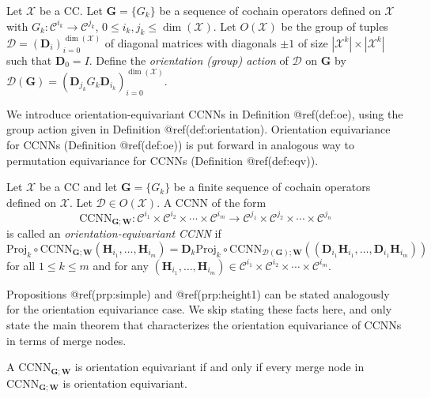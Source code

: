 \documentclass[
  12pt,
]{krantz}
\begin{document}
\label{orientation}
Let \(\mathcal{X}\) be a CC. Let \(\mathbf{G}=\{G_k\}\) be a sequence of
cochain operators defined on \(\mathcal{X}\) with
\(G_k  \colon \mathcal{C}^{i_k}\to \mathcal{C}^{j_k}\),
\(0\leq i_k,j_k\leq \dim(\mathcal{X})\). Let \(O(\mathcal{X})\) be the
group of tuples \(\mathcal{D}=(\mathbf{D}_i)_{i=0}^{\dim(\mathcal{X})}\)
of diagonal matrices with diagonals \(\pm 1\) of size
\(|\mathcal{X}^k| \times |\mathcal{X}^k|\) such that \(\mathbf{D}_0=I\).
Define the \emph{orientation (group) action} of \(\mathcal{D}\) on
\(\mathbf{G}\) by
\(\mathcal{D}(\mathbf{G}) = (\mathbf{D}_{j_k} G_{k} \mathbf{D}_{i_k})_{i=0}^{\dim(\mathcal{X})}\).

We introduce orientation-equivariant CCNNs in Definition @ref(def:oe),
using the group action given in Definition @ref(def:orientation).
Orientation equivariance for CCNNs (Definition @ref(def:oe)) is put
forward in analogous way to permutation equivariance for CCNNs
(Definition @ref(def:eqv)).

\label{oe}
Let \(\mathcal{X}\) be a CC and let \(\mathbf{G}= \{G_k\}\) be a finite
sequence of cochain operators defined on \(\mathcal{X}\). Let
\(\mathcal{D} \in O(\mathcal{X})\). A CCNN of the form \begin{equation*}
\mbox{CCNN}_{\mathbf{G};\mathbf{W}}\colon \mathcal{C}^{i_1}\times\mathcal{C}^{i_2}\times \cdots \times  \mathcal{C}^{i_m} \to \mathcal{C}^{j_1}\times\mathcal{C}^{j_2}\times \cdots \times \mathcal{C}^{j_n}
\end{equation*} is called an \emph{orientation-equivariant CCNN} if
\begin{equation}
\mbox{Proj}_k \circ \mbox{CCNN}_{\mathbf{G};\mathbf{W}}(\mathbf{H}_{i_1},\ldots ,\mathbf{H}_{i_m})=\mathbf{D}_{k} \mbox{Proj}_k \circ \mbox{CCNN}_{\mathcal{D}(\mathbf{G});\mathbf{W}}((\mathbf{D}_{i_1} \mathbf{H}_{i_1}, \ldots ,\mathbf{D}_{i_1} \mathbf{H}_{i_m}))
\end{equation} for all \(1 \leq k\leq m\) and for any
\((\mathbf{H}_{i_1},\ldots ,\mathbf{H}_{i_m}) \in \mathcal{C}^{i_1}\times\mathcal{C}^{i_2}\times \cdots \times  \mathcal{C}^{i_m}\).

Propositions @ref(prp:simple) and @ref(prp:height1) can be stated
analogously for the orientation equivariance case. We skip stating these
facts here, and only state the main theorem that characterizes the
orientation equivariance of CCNNs in terms of merge nodes.

\label{height3}
A \(\mbox{CCNN}_{\mathbf{G};\mathbf{W}}\) is orientation equivariant if
and only if every merge node in \(\mbox{CCNN}_{\mathbf{G};\mathbf{W}}\)
is orientation equivariant.
\end{document}
